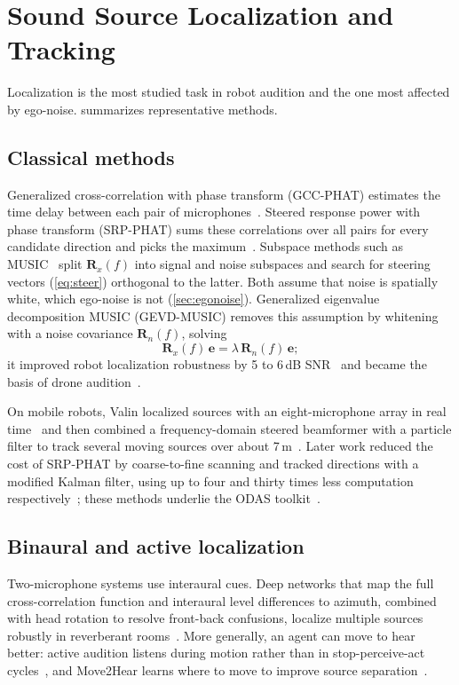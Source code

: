 \section{Sound Source Localization and Tracking}
\label{sec:ssl}

Localization is the most studied task in robot audition and the one most affected by ego-noise.
 summarizes representative methods.

\subsection{Classical methods}
Generalized cross-correlation with phase transform (GCC-PHAT) estimates the time delay between each pair of microphones~\cite{knapp1976gcc}.
Steered response power with phase transform (SRP-PHAT) sums these correlations over all pairs for every candidate direction and picks the maximum~\cite{dibiase2000srp}.
Subspace methods such as MUSIC~\cite{schmidt1986music} split $\mathbf{R}_x(f)$ into signal and noise subspaces and search for steering vectors (\cref{eq:steer}) orthogonal to the latter.
Both assume that noise is spatially white, which ego-noise is not (\cref{sec:egonoise}).
Generalized eigenvalue decomposition MUSIC (GEVD-MUSIC) removes this assumption by whitening with a noise covariance $\mathbf{R}_n(f)$, solving
\begin{equation}
\mathbf{R}_x(f)\,\mathbf{e} = \lambda\, \mathbf{R}_n(f)\,\mathbf{e};
\label{eq:gevd}
\end{equation}
it improved robot localization robustness by 5 to 6\,dB SNR~\cite{nakamura2011gevd} and became the basis of drone audition~\cite{okutani2012quadrocopter,furukawa2013ncm}.

On mobile robots, Valin \etal localized sources with an eight-microphone array in real time~\cite{valin2003robust} and then combined a frequency-domain steered beamformer with a particle filter to track several moving sources over about 7\,m~\cite{valin2007tracking}.
Later work reduced the cost of SRP-PHAT by coarse-to-fine scanning and tracked directions with a modified Kalman filter, using up to four and thirty times less computation respectively~\cite{grondin2019lightweight}; these methods underlie the ODAS toolkit~\cite{grondin2022odas}.

\subsection{Binaural and active localization}
Two-microphone systems use interaural cues.
Deep networks that map the full cross-correlation function and interaural level differences to azimuth, combined with head rotation to resolve front-back confusions, localize multiple sources robustly in reverberant rooms~\cite{ma2017binaural}.
More generally, an agent can move to hear better: active audition listens during motion rather than in stop-perceive-act cycles~\cite{nakadai2000active}, and Move2Hear learns where to move to improve source separation~\cite{majumder2021move2hear}.

